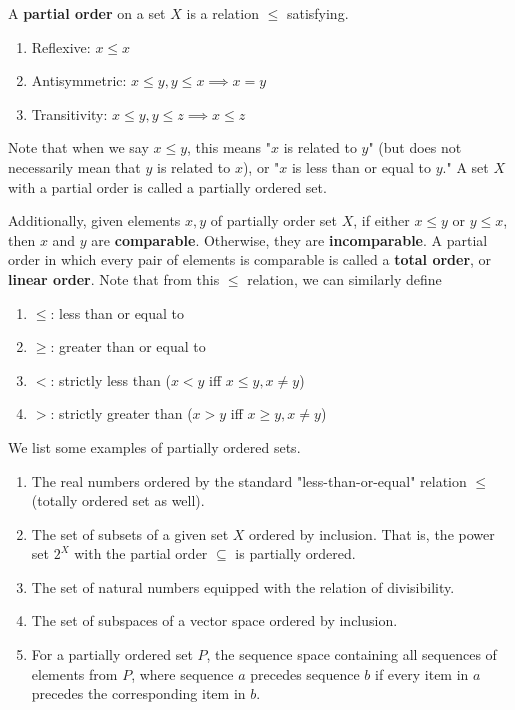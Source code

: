 \documentclass{article}
\begin{document}
      \begin{definition}
        A \textbf{partial order} on a set $X$ is a relation $\leq$ satisfying. 
        \begin{enumerate}
          \item Reflexive: $x \leq x$ 
          \item Antisymmetric: $x \leq y, y \leq x \implies x = y$
          \item Transitivity: $x \leq y, y \leq z \implies x \leq z$
        \end{enumerate}
        Note that when we say $x \leq y$, this means "$x$ is related to $y$" (but does not necessarily mean that $y$ is related to $x$), or "$x$ is less than or equal to $y$." A set $X$ with a partial order is called a partially ordered set. 

        Additionally, given elements $x, y$ of partially order set $X$, if either $x \leq y$ or $y \leq x$, then $x$ and $y$ are \textbf{comparable}. Otherwise, they are \textbf{incomparable}. A partial order in which every pair of elements is comparable is called a \textbf{total order}, or \textbf{linear order}. Note that from this $\leq$ relation, we can similarly define 
        \begin{enumerate}
          \item $\leq$: less than or equal to 
          \item $\geq$: greater than or equal to 
          \item $<$: strictly less than ($x < y$ iff $x\leq y, x \neq y$)
          \item $>$: strictly greater than ($x > y$ iff $x \geq y, x \neq y$)
        \end{enumerate}
      \end{definition} 

      \begin{example}
        We list some examples of partially ordered sets. 
        \begin{enumerate}
          \item The real numbers ordered by the standard "less-than-or-equal" relation $\leq$ (totally ordered set as well). 
          \item The set of subsets of a given set $X$ ordered by inclusion. That is, the power set $2^X$ with the partial order $\subseteq$ is partially ordered. 
          \item The set of natural numbers equipped with the relation of divisibility. 
          \item The set of subspaces of a vector space ordered by inclusion. 
          \item For a partially ordered set $P$, the sequence space containing all sequences of elements from $P$, where sequence $a$ precedes sequence $b$ if every item in $a$ precedes the corresponding item in $b$. 
        \end{enumerate}
      \end{example} 
\end{document}

